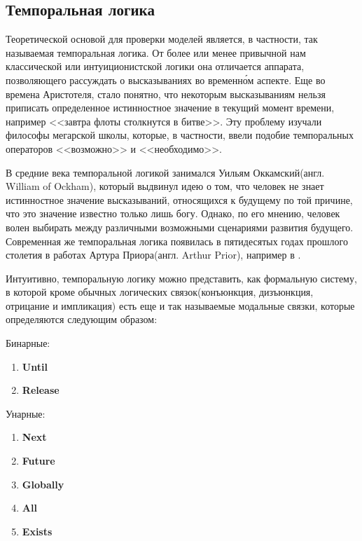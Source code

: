 \subsection{Темпоральная логика}

Теоретической основой для проверки моделей является, в частности, так называемая темпоральная логика. От более или менее привычной нам классической или интуиционистской логики она отличается аппарата, позволяющего рассуждать о высказываниях во временн\'{о}м аспекте. Еще во времена Аристотеля, стало понятно, что некоторым высказываниям нельзя приписать определенное истинностное значение в текущий момент времени, например <<завтра флоты столкнутся в битве>>. Эту проблему изучали философы мегарской школы, которые, в частности, ввели подобие темпоральных операторов <<возможно>> и <<необходимо>>.

В средние века темпоральной логикой занимался Уильям Оккамский(англ. William of Ockham), который выдвинул идею о том, что человек не знает истинностное значение высказываний, относящихся к будущему по той причине, что это значение известно только лишь богу. Однако, по его мнению, человек волен выбирать между различными возможными сценариями развития будущего. Современная же темпоральная логика появилась в пятидесятых годах прошлого столетия в работах Артура Приора(англ. Arthur Prior), например в \cite{prior1958time}.

Интуитивно, темпоральную логику можно представить, как формальную систему, в которой кроме обычных логических связок(конъюнкция, дизъюнкция, отрицание и импликация) есть еще и так называемые модальные связки, которые определяются следующим образом:

Бинарные:
\begin{enumerate}
  \item \textbf{Until}
  \item \textbf{Release}
\end{enumerate}

Унарные:
\begin{enumerate}
  \item \textbf{Next}
  \item \textbf{Future}
  \item \textbf{Globally}
  \item \textbf{All}
  \item \textbf{Exists}
\end{enumerate}
